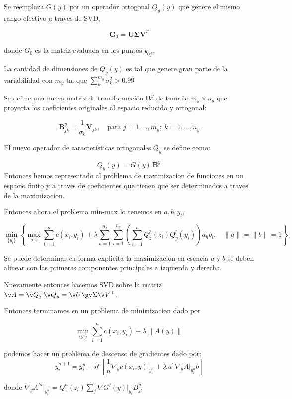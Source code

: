 \documentclass{myarticle}
\begin{document}
   Se reemplaza $G(y)$ por un operador ortogonal  $Q_y(y)$ que genere el mismo rango efectivo a traves de SVD,


\[
\mathbf{G}_0 = \mathbf{U} \boldsymbol{\Sigma} \mathbf{V}^T
\]

donde $G_0$ es la matriz evaluada en los puntos $y_{0j}$.

La cantidad de dimensiones de $Q_y(y)$ es tal que genere gran parte de la variabilidad con $m_y$ tal que $\sum_k^{m_y} \sigma_k^2 > 0.99$


Se define una nueva matriz de transformación \( \mathbf{B}^y \) de tamaño \( m_y \times n_y \) que proyecta los coeficientes originales al espacio reducido y ortogonal:

\[
\mathbf{B}^y_{jk} = \frac{1}{\sigma_k} \mathbf{V}_{jk}, \quad \text{para } j=1,\dots,m_y; \ k=1,\dots,n_y
\]

El nuevo operador de características ortogonales \( Q_y \) se define como:

\[
Q_y(y) = G(y) \, \mathbf{B}^y
\]
Entonces hemos representado al problema de maximizacion de funciones en un espacio finito y a traves de coeficientes que tienen que ser determinados a traves de la maximizacion.

Entonces ahora el problema min-max lo tenemos en $a,b,y_l$,

\[\min_{\{y_i\}} \left\{ \max_{a,b} \sum_{i=1}^{n} c(x_i, y_i) + \lambda \sum_{h=1}^{n_z} \sum_{l=1}^{n_y} \left( \sum_{i=1}^{n} Q_z^{h}(z_i) Q_y^{l}(y_i) \right) a_h b_l, \quad \|a\| = \|b\| = 1 \right\}\]

Se puede determinar en forma explicita la maximizacion en esencia $a$ y $b$ se deben alinear con las primeras componentes principales a izquierda y derecha.

Nuevamente entonces hacemos SVD sobre la matriz $\v A = \v Q_z^\top \v Q_y = \v U \gv \Sigma \v V^\top$.

Entonces terminamos en un problema de minimizacion dado por

\[\min_{\{y_i\}}  \sum_{i=1}^{n} c(x_i, y_i) + \lambda  \, \|A(y)\| \]

podemos hacer un problema de descenso de gradientes dado por:
\[y_i^{n+1} = y_i^n - \eta^n \left[ \frac{1}{n} \nabla_y c(x_i, y)\big|_{y_i^n} + \lambda \, a^{\prime} \, \nabla_y A\big|_{y_i^n} b \right]
\]

donde \(\nabla_y A^{hl}\Big|_{y_i^n} = Q_z^h(z_i) \sum_j \nabla G^j(y)\big|_{y_i} B_{jl}^y\)

\end{document}
